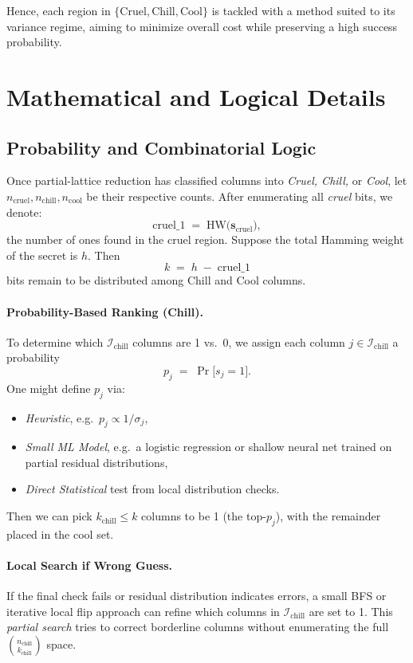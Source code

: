 \documentclass[conference]{IEEEtran}
\begin{document}
Hence, each region in $\{\mathrm{Cruel, Chill, Cool}\}$ is tackled with a method suited to its variance regime, aiming to minimize overall cost while preserving a high success probability.

\section{Mathematical and Logical Details}
\label{sec:math-logic}

\subsection{Probability and Combinatorial Logic}
\label{subsec:prob-comb}

Once partial-lattice reduction has classified columns into \emph{Cruel, Chill,} or \emph{Cool}, let 
$n_{\mathrm{cruel}}, n_{\mathrm{chill}}, n_{\mathrm{cool}}$ be their respective counts. After enumerating all \emph{cruel} bits, we denote:
\[
  \mathrm{cruel\_1} \;=\; \mathrm{HW}\bigl(\mathbf{s}_{\mathrm{cruel}}\bigr),
\]
the number of ones found in the cruel region. Suppose the total Hamming weight of the secret is $h$. Then 
\[
  k \;=\; h \;-\; \mathrm{cruel\_1}
\]
bits remain to be distributed among Chill and Cool columns.

\paragraph{Probability-Based Ranking (Chill).}  
To determine which $\mathcal{I}_{\mathrm{chill}}$ columns are 1 vs.\ 0, we assign each column $j \in \mathcal{I}_{\mathrm{chill}}$ a probability 
\[
  p_j \;=\; \Pr\bigl[s_j = 1\bigr].
\]
One might define $p_j$ via:
\begin{itemize}
  \item \emph{Heuristic}, e.g.\ $p_j \propto 1 / \sigma_j$,
  \item \emph{Small ML Model}, e.g.\ a logistic regression or shallow neural net trained on partial residual distributions,
  \item \emph{Direct Statistical} test from local distribution checks.
\end{itemize}
Then we can pick $k_{\mathrm{chill}} \le k$ columns to be 1 (the top-$p_j$), with the remainder placed in the cool set.

\paragraph{Local Search if Wrong Guess.}  
If the final check fails or residual distribution indicates errors, a small BFS or iterative local flip approach can refine which columns in $\mathcal{I}_{\mathrm{chill}}$ are set to 1. This \emph{partial search} tries to correct borderline columns without enumerating the full $\binom{n_{\mathrm{chill}}}{k_{\mathrm{chill}}}$ space.
\end{document}
